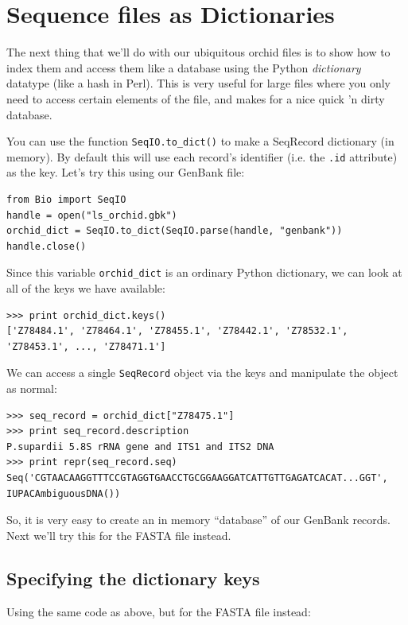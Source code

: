 \documentclass{report}
\begin{document}
\section{Sequence files as Dictionaries}

The next thing that we'll do with our ubiquitous orchid files is to show how to index them and access them like a database using the Python {\it dictionary} datatype (like a hash in Perl). This is very useful for large files where you only need to access certain elements of the file, and makes for a nice quick 'n dirty database.

You can use the function \verb|SeqIO.to_dict()| to make a SeqRecord dictionary (in memory).  By default this will use each record's identifier (i.e. the \verb|.id| attribute) as the key.  Let's try this using our GenBank file:

\begin{verbatim}
from Bio import SeqIO
handle = open("ls_orchid.gbk")
orchid_dict = SeqIO.to_dict(SeqIO.parse(handle, "genbank"))
handle.close()
\end{verbatim}

Since this variable \verb|orchid_dict| is an ordinary Python dictionary, we can look at all of the keys we have available:

\begin{verbatim}
>>> print orchid_dict.keys()
['Z78484.1', 'Z78464.1', 'Z78455.1', 'Z78442.1', 'Z78532.1', 'Z78453.1', ..., 'Z78471.1']
\end{verbatim}

We can access a single \verb|SeqRecord| object via the keys and manipulate the object as normal:

\begin{verbatim}
>>> seq_record = orchid_dict["Z78475.1"]
>>> print seq_record.description
P.supardii 5.8S rRNA gene and ITS1 and ITS2 DNA
>>> print repr(seq_record.seq)
Seq('CGTAACAAGGTTTCCGTAGGTGAACCTGCGGAAGGATCATTGTTGAGATCACAT...GGT', IUPACAmbiguousDNA())
\end{verbatim}

So, it is very easy to create an in memory ``database'' of our GenBank records.  Next we'll try this for the FASTA file instead.

\subsection{Specifying the dictionary keys}

Using the same code as above, but for the FASTA file instead:
\end{document}
